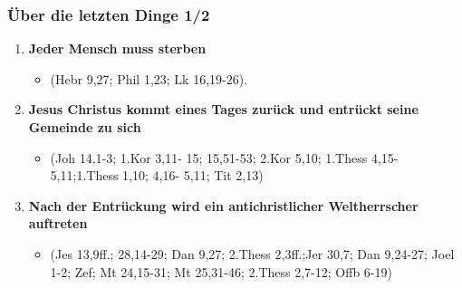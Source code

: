 \documentclass[aspectratio=43]{beamer}
\begin{document}
\begin{frame}
    \frametitle{Über die letzten Dinge 1/2}  %
    \vspace{0.80cm}    
    \begin{enumerate}
        \item \textbf{Jeder Mensch muss sterben}
            \begin{itemize}              
                \item (Hebr 9,27; Phil 1,23; Lk 16,19-26).               
            \end{itemize}            
            \vspace{0.2cm}
            \pause
        \item \textbf{Jesus Christus kommt eines Tages zurück und entrückt seine Gemeinde zu sich}
            \begin{itemize}
                \item (Joh 14,1-3; 1.Kor 3,11- 15; 15,51-53; 2.Kor 5,10; 1.Thess 4,15-5,11;1.Thess 1,10; 4,16- 5,11; Tit 2,13)
            \end{itemize}            
            \vspace{0.2cm}
            \pause
        \item \textbf{Nach der Entrückung wird ein antichristlicher Weltherrscher auftreten}
            \begin{itemize}
                \item  (Jes 13,9ff.; 28,14-29; Dan 9,27; 2.Thess 2,3ff.;Jer 30,7; Dan 9,24-27; Joel 1-2; Zef; Mt 24,15-31; Mt 25,31-46; 2.Thess 2,7-12; Offb 6-19)
            \end{itemize} 
            \vspace{0.2cm}
            \end{enumerate}   
    \end{frame}
\end{document}
